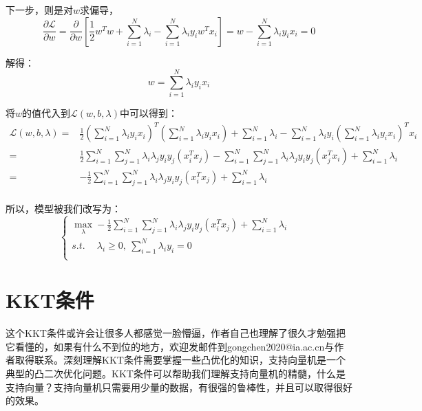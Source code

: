 \documentclass[a4paper]{article}
\begin{document}
下一步，则是对$w$求偏导，
\begin{equation}
    \frac{\partial \mathcal{L}}{\partial w} 
    = \frac{\partial }{\partial w}[\frac{1}{2}w^Tw + \sum_{i=1}^N\lambda_i - \sum_{i=1}^N\lambda_iy_iw^Tx_i]
    = w - \sum_{i=1}^N\lambda_iy_ix_i = 0 
\end{equation}

解得：
\begin{equation}
    w = \sum_{i=1}^N\lambda_iy_ix_i 
\end{equation}

将$w$的值代入到$\mathcal{L}(w,b,\lambda)$中可以得到：
\begin{equation}
    \begin{split}
        \mathcal{L}(w,b,\lambda) = & \frac{1}{2}(\sum_{i=1}^N\lambda_iy_ix_i)^T(\sum_{i=1}^N\lambda_iy_ix_i) + \sum_{i=1}^N\lambda_i - \sum_{i=1}^N\lambda_iy_i(\sum_{i=1}^N\lambda_iy_ix_i)^Tx_i \\
        = & \frac{1}{2}\sum_{i=1}^N\sum_{j=1}^N\lambda_i\lambda_jy_iy_j(x_i^Tx_j) - \sum_{i=1}^N\sum_{j=1}^N\lambda_i\lambda_jy_iy_j(x_j^Tx_i) + \sum_{i=1}^N\lambda_i \\
        = & -\frac{1}{2}\sum_{i=1}^N\sum_{j=1}^N\lambda_i\lambda_jy_iy_j(x_i^Tx_j) + \sum_{i=1}^N\lambda_i \\
    \end{split}
\end{equation}

所以，模型被我们改写为：
\begin{equation}
    \left\{
    \begin{array}{ll}
          \max_\lambda -\frac{1}{2}\sum_{i=1}^N\sum_{j=1}^N\lambda_i\lambda_jy_iy_j(x_i^Tx_j) + \sum_{i=1}^N\lambda_i & \\
          s.t.\quad \ \lambda_i \geq 0,\ \sum_{i=1}^N \lambda_iy_i = 0  & \\
    \end{array}
    \right.
\end{equation}

\section{KKT条件}
这个KKT条件或许会让很多人都感觉一脸懵逼，作者自己也理解了很久才勉强把它看懂的，如果有什么不到位的地方，欢迎发邮件到gongchen2020@ia.ac.cn与作者取得联系。深刻理解KKT条件需要掌握一些凸优化的知识，支持向量机是一个典型的凸二次优化问题。KKT条件可以帮助我们理解支持向量机的精髓，什么是支持向量？支持向量机只需要用少量的数据，有很强的鲁棒性，并且可以取得很好的效果。
\end{document}
